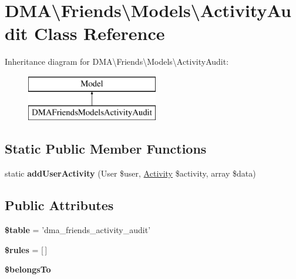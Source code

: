 \hypertarget{classDMA_1_1Friends_1_1Models_1_1ActivityAudit}{\section{D\+M\+A\textbackslash{}Friends\textbackslash{}Models\textbackslash{}Activity\+Audit Class Reference}
\label{classDMA_1_1Friends_1_1Models_1_1ActivityAudit}
}
Inheritance diagram for D\+M\+A\textbackslash{}Friends\textbackslash{}Models\textbackslash{}Activity\+Audit\+:\begin{figure}[H]
\begin{center}
\leavevmode
\includegraphics[height=2.000000cm]{de/d4b/classDMA_1_1Friends_1_1Models_1_1ActivityAudit}
\end{center}
\end{figure}
\subsection*{Static Public Member Functions}
\begin{DoxyCompactItemize}
\item 
\hypertarget{classDMA_1_1Friends_1_1Models_1_1ActivityAudit_ac19a5624e746c37d597f8d2f5028d5c7}{static {\bfseries add\+User\+Activity} (User \$user, \hyperlink{classDMA_1_1Friends_1_1Models_1_1Activity}{Activity} \$activity, array \$data)}\label{classDMA_1_1Friends_1_1Models_1_1ActivityAudit_ac19a5624e746c37d597f8d2f5028d5c7}

\end{DoxyCompactItemize}
\subsection*{Public Attributes}
\begin{DoxyCompactItemize}
\item 
\hypertarget{classDMA_1_1Friends_1_1Models_1_1ActivityAudit_a8a73d8b28f436aed8088e0b5923b2b55}{{\bfseries \$table} = 'dma\+\_\+friends\+\_\+activity\+\_\+audit'}\label{classDMA_1_1Friends_1_1Models_1_1ActivityAudit_a8a73d8b28f436aed8088e0b5923b2b55}

\item 
\hypertarget{classDMA_1_1Friends_1_1Models_1_1ActivityAudit_a909093d545674b85d9a6b63d58e7529e}{{\bfseries \$rules} = \mbox{[}$\,$\mbox{]}}\label{classDMA_1_1Friends_1_1Models_1_1ActivityAudit_a909093d545674b85d9a6b63d58e7529e}

\item 
{\bfseries \$belongs\+To}
\end{DoxyCompactItemize}
